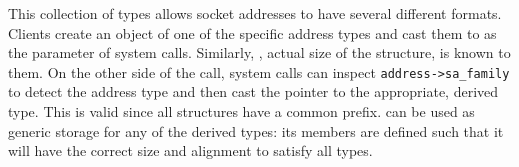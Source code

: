 This collection of types allows socket addresses to have several different
formats.  Clients create an object of one of the specific address types and cast
them to  as the  parameter of system
calls.  Similarly, , actual size of the structure, is known
to them.  On the other side of the call, system calls can inspect
\texttt{address->sa\_family} to detect the address type and then cast the
pointer to the appropriate, derived type.  This is valid since all structures
have a common prefix.   can be used as generic storage
for any of the derived types: its members are defined such that it will have the
correct size and alignment to satisfy all types.
